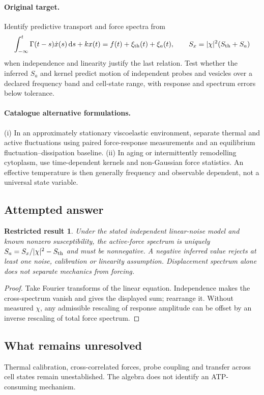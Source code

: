\documentclass[11pt]{article}
\newcommand{\dd}{\,\mathrm d}
\newtheorem{attemptresult}{Restricted result}[section]
\begin{document}
\paragraph{Original target.}
Identify predictive transport and force spectra from
\[\int_{-\infty}^t\Gamma(t-s)\dot x(s)\dd s+kx(t)=f(t)+\xi_{\rm th}(t)+\xi_a(t),\qquad S_x=|\chi|^2(S_{\rm th}+S_a)\]
when independence and linearity justify the last relation. Test whether the inferred $S_a$ and kernel predict motion of independent probes and vesicles over a declared frequency band and cell-state range, with response and spectrum errors below tolerance.
\paragraph{Catalogue alternative formulations.}
(i) In an approximately stationary viscoelastic environment, separate thermal and active fluctuations using paired force-response measurements and an equilibrium fluctuation--dissipation baseline. (ii) In aging or intermittently remodelling cytoplasm, use time-dependent kernels and non-Gaussian force statistics. An effective temperature is then generally frequency and observable dependent, not a universal state variable.
\subsection{Attempted answer}
\begin{attemptresult}
Under the stated independent linear-noise model and known nonzero susceptibility, the active-force spectrum is uniquely $S_a=S_x/|\chi|^2-S_{\rm th}$ and must be nonnegative. A negative inferred value rejects at least one noise, calibration or linearity assumption. Displacement spectrum alone does not separate mechanics from forcing.
\end{attemptresult}
\begin{proof}
Take Fourier transforms of the linear equation. Independence makes the cross-spectrum vanish and gives the displayed sum; rearrange it. Without measured $\chi$, any admissible rescaling of response amplitude can be offset by an inverse rescaling of total force spectrum.
\end{proof}
\subsection{What remains unresolved}
Thermal calibration, cross-correlated forces, probe coupling and transfer across cell states remain unestablished. The algebra does not identify an ATP-consuming mechanism.
\end{document}
